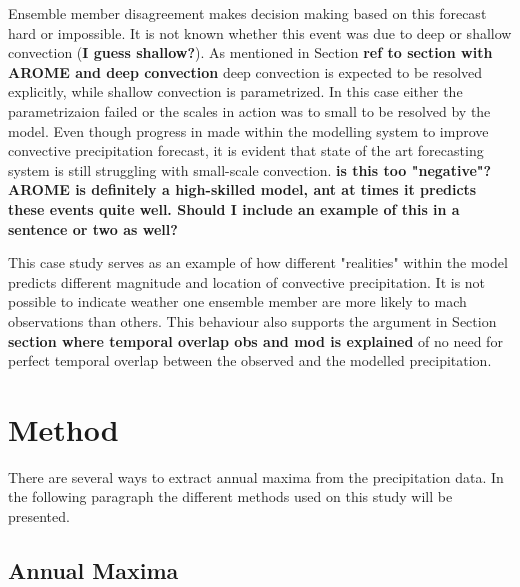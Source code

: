 Ensemble member disagreement makes decision making based on this forecast hard or impossible. It is not known whether this event was due to deep or shallow convection (\textbf{I guess shallow?}). As mentioned in Section \textbf{ref to section with AROME and deep convection} deep convection is expected to be resolved explicitly, while shallow convection is parametrized. In this case either the parametrizaion failed or the scales in action was to small to be resolved by the model. Even though progress in made within the modelling system to improve convective precipitation forecast, it is evident that state of the art forecasting system is still struggling with small-scale convection. \textbf{is this too "negative"? AROME is definitely a high-skilled model, ant at times it predicts these events quite well. Should I include an example of this in a sentence or two as well?}

This case study serves as an example of how different "realities" within the model predicts different magnitude and location of convective precipitation. It is not possible to indicate weather one ensemble member are more likely to mach observations than others. This behaviour also supports the argument in Section \textbf{section where temporal overlap obs and mod is explained} of no need for perfect temporal overlap between the observed and the modelled precipitation.       

\section{Method}

There are several ways to extract annual maxima from the precipitation data. In the following paragraph the different methods used on this study will be presented.  
\subsection{Annual Maxima}

